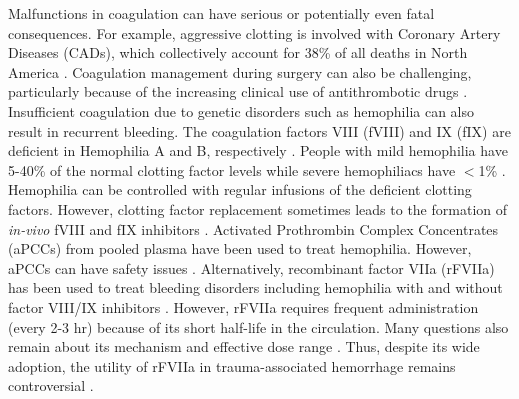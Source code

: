 \documentclass[12pt]{article}
\begin{document}
Malfunctions in coagulation can have serious or potentially even fatal consequences.
For example, aggressive clotting is involved with Coronary Artery Diseases (CADs), which collectively account for 38\% of all deaths in North America \cite{HANSSON2005}.
Coagulation management during surgery can also be challenging, particularly because of the increasing clinical use of antithrombotic drugs \cite{Tanaka:2009wo}.   
Insufficient coagulation due to genetic disorders such as hemophilia can also result in recurrent bleeding. 
The coagulation factors VIII (fVIII) and IX (fIX) are deficient in Hemophilia A and B, respectively \cite{COOPER1994,MANNUCCI2001,MITCHELL2008}.
People with mild hemophilia have 5-40\% of the normal clotting factor levels while severe hemophiliacs have $<$1\% \cite{MITCHELL2008}.
Hemophilia can be controlled with regular infusions of the deficient clotting factors. 
However, clotting factor replacement sometimes leads to the formation of \emph{in-vivo} fVIII and fIX inhibitors \cite{TOMOKIYO2003}.
Activated Prothrombin Complex Concentrates (aPCCs) from pooled plasma have been used to treat hemophilia. 
However, aPCCs can have safety issues \cite{CHAVIN1988,ALLEN2006,SCHNEIDERMAN2007}. 
Alternatively, recombinant factor VIIa (rFVIIa) has been used to treat bleeding disorders \cite{Hedner:2008rm,Talbot:2009kk} including
hemophilia with and without factor VIII/IX inhibitors \cite{Lusher:1998bs,Shapiro:1998sh,Shapiro:2000pr,Shapiro:2008px}.
However, rFVIIa requires frequent administration (every 2-3 hr) because of its short half-life in the circulation. 
Many questions also remain about its mechanism \cite{KOMIYAMA1990,PAYNE1996,MONROE1997,HOFFMAN1998,BUTENAS2002a,ROBERTS2004,ROBERTS2006,ALLEN2007}
and effective dose range \cite{TOMOKIYO2003}.
Thus, despite its wide adoption, the utility of rFVIIa in trauma-associated hemorrhage remains controversial \cite{Duchesne:2008hw}.
\end{document}
